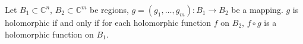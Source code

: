Let $B_1 \subset \mathbb{C}^n$, $B_2 \subset \mathbb{C}^m$ be regions, $g = (g_1, \ldots, g_m): B_1 \to B_2$ be a mapping. $g$ is holomorphic if and only if for each holomorphic function $f$ on $B_2$, $f \circ g$ is a holomorphic function on $B_1$.
